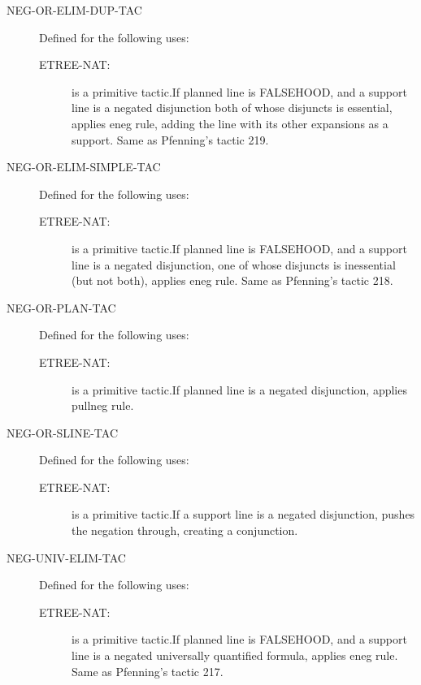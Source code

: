 \begin{description}
\item[NEG-OR-ELIM-DUP-TAC]  Defined for the following uses:
\begin{description}
\item[ETREE-NAT:]  is a primitive tactic.If planned line is FALSEHOOD, and a support line is a negated disjunction
both of whose disjuncts is essential, applies eneg rule, 
adding the line with its other expansions as a support.
Same as Pfenning's tactic 219.

\end{description}

\item[NEG-OR-ELIM-SIMPLE-TAC]  Defined for the following uses:
\begin{description}
\item[ETREE-NAT:]  is a primitive tactic.If planned line is FALSEHOOD, and a support line is a negated disjunction,
one of whose disjuncts is inessential (but not both), applies eneg rule.
Same as Pfenning's tactic 218.

\end{description}

\item[NEG-OR-PLAN-TAC]  Defined for the following uses:
\begin{description}
\item[ETREE-NAT:]  is a primitive tactic.If planned line is a negated disjunction, applies pullneg rule.

\end{description}

\item[NEG-OR-SLINE-TAC]  Defined for the following uses:
\begin{description}
\item[ETREE-NAT:]  is a primitive tactic.If a support line is a negated disjunction, pushes the negation
through, creating a conjunction.

\end{description}

\item[NEG-UNIV-ELIM-TAC]  Defined for the following uses:
\begin{description}
\item[ETREE-NAT:]  is a primitive tactic.If planned line is FALSEHOOD, and a support line is a negated universally
quantified formula, applies eneg rule.  Same as Pfenning's tactic 217.


\end{description}
\end{description}
